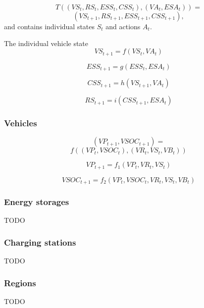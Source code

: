 \[
	T((VS_t, RS_t, ESS_t, CSS_t), (VA_t, ESA_t)) = 
\]
\[
	(VS_{t+1}, RS_{t+1}, ESS_{t+1}, CSS_{t+1}) \mathrm{,}
\]
and contains individual states $S_t$ and actions $A_t$.

The individual vehicle state
\[
	VS_{t+1} = f(VS_t, VA_t)
\]

\[
	ESS_{t+1} = g(ESS_t, ESA_t)	
\]

\[
	CSS_{t+1} = h(VS_{t+1}, VA_t)
\]

\[
	RS_{t+1} = i(CSS_{t+1}, ESA_t)
\]

\subsubsection{Vehicles}

\[
	(VP_{t+1}, VSOC_{t+1}) =
\]
\[
	f((VP_t, VSOC_t), (VR_t, VS_t, VB_t))
\]

\[
	VP_{t+1} = f_1(VP_t, VR_t, VS_t)
\]

\[
	VSOC_{t+1} = f_2(VP_t, VSOC_t, VR_t, VS_t, VB_t)
\]

\subsubsection{Energy storages}

TODO

\subsubsection{Charging stations}

TODO

\subsubsection{Regions}

TODO